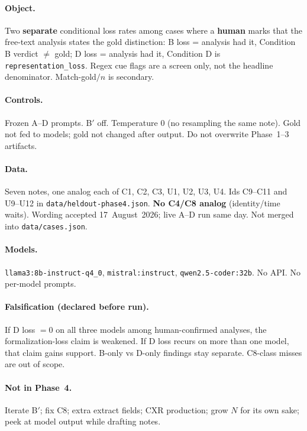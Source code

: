 \documentclass[11pt,a4paper]{article}
\begin{document}
\paragraph{Object.}
Two \textbf{separate} conditional loss rates among cases where a \textbf{human} marks that the free-text analysis states the gold distinction:
B loss = analysis had it, Condition B verdict $\neq$ gold;
D loss = analysis had it, Condition D is \texttt{representation\_loss}.
Regex cue flags are a screen only, not the headline denominator.
Match-gold$/n$ is secondary.

\paragraph{Controls.}
Frozen A--D prompts. B$'$ off. Temperature 0 (no resampling the same note). Gold not fed to models; gold not changed after output. Do not overwrite Phase~1--3 artifacts.

\paragraph{Data.}
Seven notes, one analog each of C1, C2, C3, U1, U2, U3, U4. Ids C9--C11 and U9--U12 in \texttt{data/heldout-phase4.json}.
\textbf{No C4/C8 analog} (identity/time waits).
Wording accepted 17~August~2026; live A--D run same day.
Not merged into \texttt{data/cases.json}.

\paragraph{Models.}
\texttt{llama3:8b-instruct-q4\_0}, \texttt{mistral:instruct}, \texttt{qwen2.5-coder:32b}.
No API. No per-model prompts.

\paragraph{Falsification (declared before run).}
If D loss $=0$ on all three models among human-confirmed analyses, the formalization-loss claim is weakened.
If D loss recurs on more than one model, that claim gains support.
B-only vs D-only findings stay separate. C8-class misses are out of scope.

\paragraph{Not in Phase~4.}
Iterate B$'$; fix C8; extra extract fields; CXR production; grow $N$ for its own sake; peek at model output while drafting notes.
\end{document}
